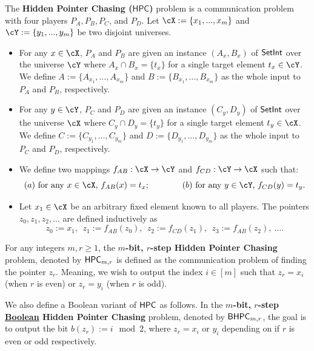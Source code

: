 \documentclass[11pt,letterpaper]{article}
\newcommand{\HPC}{\mathsf{HPC}}
\renewcommand{\geq}{\geqslant}
\theoremstyle{definition}
\newcommand{\bhpc}{\ensuremath{\textnormal{\textsf{BHPC}}}\xspace}
\newcommand{\hpc}{\ensuremath{\textnormal{\textsf{HPC}}}\xspace}
\newcommand{\setint}{\ensuremath{\textnormal{\textsf{SetInt}}}\xspace}
\begin{document}
\begin{definition}\label{prob:hpc}
The \textbf{Hidden Pointer Chasing ($\HPC$)} problem is a communication problem
with four players $P_A, P_B, P_C$, and $P_D$. 
Let $\cX := \{x_1,...,x_m\}$ and $\cY := \{y_1,...,y_m\}$ be two disjoint universes. 
    \begin{itemize}
        \item For any $x\in \cX$, $P_A$ and $P_B$ are given an instance $(A_x,B_x)$ of \setint over the universe $\cY$ where $A_x \cap B_x = \{t_x\}$ for a single target element $t_x \in \cY$. We define $A := \{A_{x_1} ,\ldots, A_{x_m} \}$ and $B:=\{B_{x_1} ,\ldots, B_{x_m} \}$ as the whole input to $P_A$ and $P_B$, respectively.
        
        \item For any $y\in \cY$, $P_C$ and $P_D$ are given an instance $(C_y,D_y)$ of $\setint$ over the universe $\cX$ where $C_y \cap D_y = \{t_y\}$ for a single target element $t_y \in \cX$. We define $C := \{C_{y_1} ,\ldots, C_{y_m} \}$ and $D:=\{D_{y_1} ,\ldots,D_{y_m} \}$ as the whole input to $P_C$ and $P_D$, respectively.
        
        \item We define two mappings $f_{AB} : \cX \to \cY$ and $f_{CD} : \cY \to \cX$ such that:
        \[
            (a) ~ \textnormal{for any $x\in \cX$, $f_{AB}(x) = t_x$;} \qquad \qquad (b) ~ \textnormal{for any $y\in \cY$, $f_{CD}(y) = t_y$}.
         \]
        \item Let $x_1 \in \cX$ be an arbitrary fixed element known to all players. The pointers $z_0,z_1,z_2,\ldots$ are defined inductively as 
        $$z_0 := x_1, ~~z_1 := f_{AB}(z_0),~~ z_2 := f_{CD}(z_1), ~~z_3 := f_{AB}(z_2),~\ldots.$$
    \end{itemize}
For any integers $m,r \geq 1$, the \textnormal{\textbf{$m$-bit, $r$-step Hidden Pointer Chasing}} problem, denoted by $\hpc_{m,r}$ is defined as the communication problem of finding the pointer $z_r$. Meaning, we wish to output the index $i \in [m]$ such that $z_r = x_i$ (when $r$ is even) or $z_r = y_i$ (when $r$ is odd). 

We also define a Boolean variant of $\hpc$ as follows. In the \textnormal{\textbf{$m$-bit, $r$-step \underline{Boolean} Hidden Pointer Chasing}} problem, denoted by $\bhpc_{m,r}$, the goal is to output the bit $b(z_r):=i \mod 2$, where $z_r = x_i$ or $y_i$ depending on if $r$ is even or odd respectively. 
\end{definition}
\end{document}
